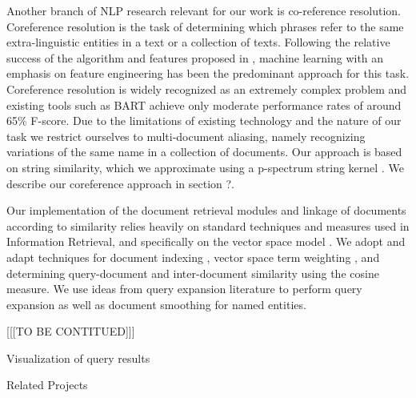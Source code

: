 Another branch of NLP research relevant for our work is co-reference resolution. 
Coreference resolution is the task of determining which phrases refer to the same extra-linguistic entities in a text or a collection of texts.
Following the relative success of the algorithm and features proposed in \cite {soon2001coreference}, machine learning 
with an emphasis on feature engineering has been the predominant approach for this task. Coreference resolution is widely 
recognized as an extremely complex problem and existing tools such as BART \cite{bart} achieve only moderate performance rates 
of around 65\% F-score. Due to the limitations of existing technology and the nature of our task we restrict ourselves to multi-document 
aliasing, namely recognizing variations of the same name in a collection of documents. Our approach is based on string similarity, 
which we approximate using a p-spectrum string kernel \cite{kernels2004}. We describe our coreference approach in section ?.

Our implementation of the document retrieval modules and linkage of documents according to similarity relies heavily on standard techniques 
and measures used in Information Retrieval, and  specifically on the vector space model \cite{ir2008}. We adopt and adapt techniques for 
document indexing \cite{indexing1999}, vector space term weighting \cite{jones2004}, \cite{salton1971} and determining query-document and 
inter-document similarity using the cosine measure. We use ideas from query expansion literature \cite{xu1996} to perform query expansion 
as well as document smoothing for named entities. 

[[[TO BE CONTITUED]]]

Visualization of query results

Related Projects 

